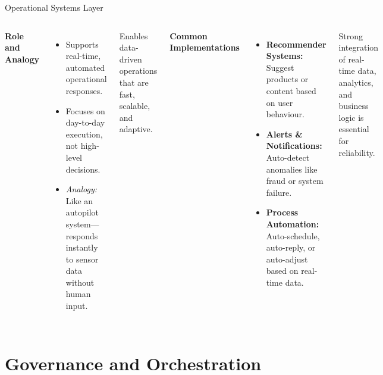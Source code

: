 \documentclass[aspectratio=169, table]{beamer}
\begin{document}
	\begin{frame}[fragile]{Operational Systems Layer}
		\vspace{20pt}
		\begin{columns}[T,onlytextwidth]
			\textbf{Role and Analogy}
			\begin{itemize}
				\item Supports real-time, automated operational responses.
				\item Focuses on day-to-day execution, not high-level decisions.
				\item \textit{Analogy:} Like an autopilot system—responds instantly to sensor data without human input.
			\end{itemize}
			Enables data-driven operations that are fast, scalable, and adaptive.
			
			\textbf{Common Implementations}
			\begin{itemize}
				\item \textbf{Recommender Systems:} Suggest products or content based on user behaviour.
				\item \textbf{Alerts \& Notifications:} Auto-detect anomalies like fraud or system failure.
				\item \textbf{Process Automation:} Auto-schedule, auto-reply, or auto-adjust based on real-time data.
			\end{itemize}
			Strong integration of real-time data, analytics, and business logic is essential for reliability.
		\end{columns}
	\end{frame}
	
	\section{Governance and Orchestration}
	
\end{document}

